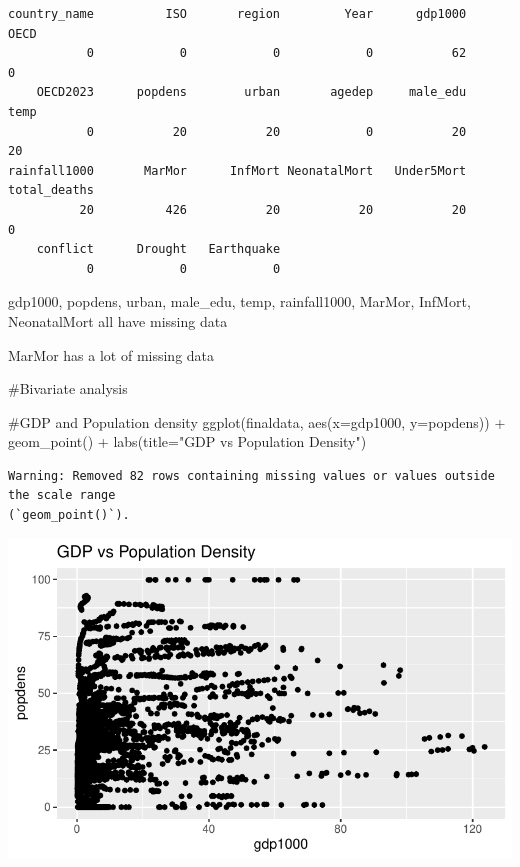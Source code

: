 \documentclass[
  letterpaper,
  DIV=11,
  numbers=noendperiod]{scrartcl}
\newenvironment{Shaded}{\begin{snugshade}}{\end{snugshade}}
\newcommand{\AttributeTok}[1]{\textcolor[rgb]{0.40,0.45,0.13}{#1}}
\newcommand{\CommentTok}[1]{\textcolor[rgb]{0.37,0.37,0.37}{#1}}
\newcommand{\FunctionTok}[1]{\textcolor[rgb]{0.28,0.35,0.67}{#1}}
\newcommand{\NormalTok}[1]{\textcolor[rgb]{0.00,0.23,0.31}{#1}}
\newcommand{\SpecialCharTok}[1]{\textcolor[rgb]{0.37,0.37,0.37}{#1}}
\newcommand{\StringTok}[1]{\textcolor[rgb]{0.13,0.47,0.30}{#1}}
\begin{document}
\begin{verbatim}
country_name          ISO       region         Year      gdp1000         OECD 
           0            0            0            0           62            0 
    OECD2023      popdens        urban       agedep     male_edu         temp 
           0           20           20            0           20           20 
rainfall1000       MarMor      InfMort NeonatalMort   Under5Mort total_deaths 
          20          426           20           20           20            0 
    conflict      Drought   Earthquake 
           0            0            0 
\end{verbatim}

gdp1000, popdens, urban, male\_edu, temp, rainfall1000, MarMor, InfMort,
NeonatalMort all have missing data

MarMor has a lot of missing data

\begin{Shaded}
\begin{Highlighting}[]
\CommentTok{\#Bivariate analysis}

\CommentTok{\#GDP and Population density}
\FunctionTok{ggplot}\NormalTok{(finaldata, }\FunctionTok{aes}\NormalTok{(}\AttributeTok{x=}\NormalTok{gdp1000, }\AttributeTok{y=}\NormalTok{popdens)) }\SpecialCharTok{+} 
  \FunctionTok{geom\_point}\NormalTok{() }\SpecialCharTok{+} 
  \FunctionTok{labs}\NormalTok{(}\AttributeTok{title=}\StringTok{"GDP vs Population Density"}\NormalTok{)}
\end{Highlighting}
\end{Shaded}

\begin{verbatim}
Warning: Removed 82 rows containing missing values or values outside the scale range
(`geom_point()`).
\end{verbatim}

\includegraphics{week4_eda_inclass_files/figure-pdf/unnamed-chunk-7-1.pdf}
\end{document}
